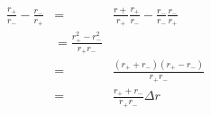 \begin{eqnarray}\label{eqn:net-likelihood}
\frac{r_+}{r_-} - \frac{r_-}{r_+} & = & \frac{r+}{r_+}\frac{r_+}{r_-} - \frac{r_-}{r_-}\frac{r_-}{r_+} \\
& =  \frac{r_+^2 - r_-^2}{r_+r_-} \\
& = & \frac{(r_+ + r_-)(r_+ - r_-)}{r_+r_-} \\
& = & \frac{r_+ + r_-}{r_+r_-}\Delta r \\
\end{eqnarray}